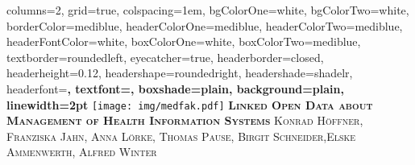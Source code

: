 \documentclass[portrait,final,a0paper,fontscale=0.310]{baposter}
\begin{document}


\begin{poster}%
  {
  columns=2,
  grid=true,
  colspacing=1em,
  bgColorOne=white,
  bgColorTwo=white,
  borderColor=mediblue,
  headerColorOne=mediblue,
  headerColorTwo=mediblue,
  headerFontColor=white,
  boxColorOne=white,
  boxColorTwo=mediblue,
  textborder=roundedleft,
  eyecatcher=true,
  headerborder=closed,
  headerheight=0.12\textheight,
  headershape=roundedright,
  headershade=shadelr,
  headerfont=\Large\bf\textsc, %
  textfont={\setlength{\parindent}{1.5em}},
  boxshade=plain,
  background=plain,
  linewidth=2pt
  }
  {\texttt{[image: img/medfak.pdf]}} 
  {\bf\textsc{Linked Open Data about Management of Health Information Systems}\vspace{0.5em}
  }
  {\textsc{Konrad Höffner, Franziska Jahn, Anna Lörke, Thomas Pause, Birgit Schneider,Elske
  Ammenwerth, Alfred Winter}}
  {%
  }

    \newcommand{\colouredcircle}{%
      \tikz{\useasboundingbox (-0.2em,-0.32em) rectangle(0.2em,0.32em); \draw[draw=black,fill=imiseblue,line width=0.03em] (0,0) circle(0.18em);}}


\end{poster}
\end{document}

